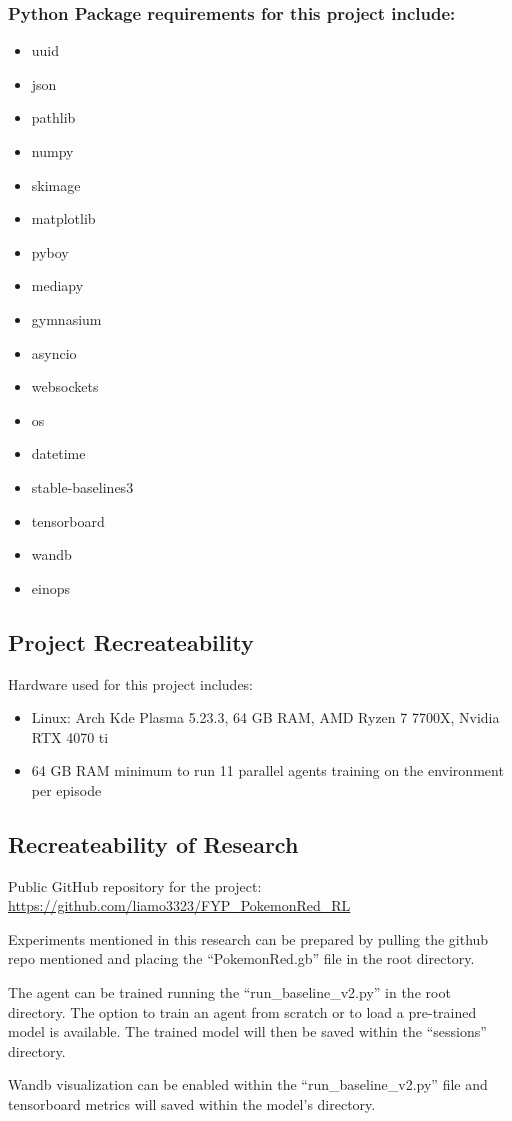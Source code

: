 \subsubsection*{Python Package requirements for this project include: }

\begin{multicols}{2}
\begin{itemize}
    \item uuid
    \item json
    \item pathlib
    \item numpy
    \item skimage
    \item matplotlib
    \item pyboy
    \item mediapy
    \item gymnasium
    \item asyncio
    \item websockets
    \item os
    \item datetime
    \item stable-baselines3
    \item tensorboard
    \item wandb
    \item einops
\end{itemize}
\end{multicols}

\subsection{Project Recreateability}\label{subsec:Hardware}

Hardware used for this project includes:
\begin{itemize}
    \item Linux: Arch Kde Plasma 5.23.3, 64 GB RAM, AMD Ryzen 7 7700X, Nvidia RTX 4070 ti
    \item 64 GB RAM minimum to run 11 parallel agents training on the environment per episode

\end{itemize}

\subsection{Recreateability of Research}

Public GitHub repository for the project: \url{https://github.com/liamo3323/FYP_PokemonRed_RL}

Experiments mentioned in this research can be prepared by pulling the github repo mentioned and placing the ``PokemonRed.gb'' file in the root directory. 

The agent can be trained running the ``run\_baseline\_v2.py'' in the root directory. The option to train an agent from scratch or to load a pre-trained model is available. The trained model will then be saved within the ``sessions'' directory.

Wandb visualization can be enabled within the ``run\_baseline\_v2.py'' file and tensorboard metrics will saved within the model's directory.